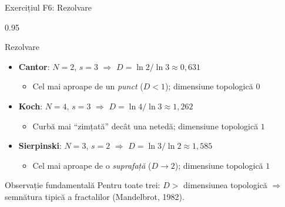 \documentclass[9pt, aspectratio=169, t]{beamer}
\begin{document}
\begin{frame}[shrink=25]{Exercițiul F6: Rezolvare}
\begin{cminipage}{0.95\textwidth}
\begin{exampleblock}{Rezolvare}
\begin{itemize}\setlength{\itemsep}{0pt}
    \item \textbf{Cantor}: $N = 2$, $s = 3$ $\Rightarrow$ $D = \ln 2 / \ln 3 \approx 0{,}631$
    \begin{itemize}\setlength{\itemsep}{0pt}
        \item Cel mai aproape de un \emph{punct} ($D < 1$); dimensiune topologică $0$
    \end{itemize}
    \item \textbf{Koch}: $N = 4$, $s = 3$ $\Rightarrow$ $D = \ln 4 / \ln 3 \approx 1{,}262$
    \begin{itemize}\setlength{\itemsep}{0pt}
        \item Curbă mai ``zimțată'' decât una netedă; dimensiune topologică $1$
    \end{itemize}
    \item \textbf{Sierpinski}: $N = 3$, $s = 2$ $\Rightarrow$ $D = \ln 3 / \ln 2 \approx 1{,}585$
    \begin{itemize}\setlength{\itemsep}{0pt}
        \item Cel mai aproape de o \emph{suprafață} ($D \to 2$); dimensiune topologică $1$
    \end{itemize}
\end{itemize}
\end{exampleblock}
\begin{block}{Observație fundamentală}
Pentru toate trei: $D > $ dimensiunea topologică $\Rightarrow$ semnătura tipică a fractalilor (Mandelbrot, 1982).
\end{block}
\end{cminipage}
\end{frame}
\end{document}
